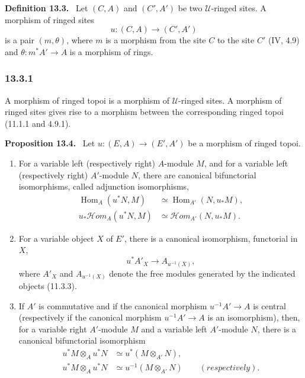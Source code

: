 \documentclass[11pt]{article}
\newcommand{\U}{\mathcal{U}}
\newcommand{\Hom}{\operatorname{Hom}}
\newcommand{\scrHom}{\mathscr{H}\!om}
\newcommand{\resp}{respectively}
\newenvironment{statement}[1]{\par\medskip\noindent\textbf{#1.}\ }{\par\medskip}
\begin{document}
\begin{statement}{Definition 13.3}
Let $(C,A)$ and $(C',A')$ be two $\U$-ringed sites. A morphism of ringed sites
\[
u:(C,A)\longrightarrow(C',A')
\]
is a pair $(m,\theta)$, where $m$ is a morphism from the site $C$ to the site $C'$ (IV, 4.9) and $\theta:m^*A'\to A$ is a morphism of rings.
\end{statement}

\subsubsection*{13.3.1}
A morphism of ringed topoi is a morphism of $\U$-ringed sites. A morphism of ringed sites gives rise to a morphism between the corresponding ringed topoi (11.1.1 and 4.9.1).

\begin{statement}{Proposition 13.4}
Let $u:(E,A)\to(E',A')$ be a morphism of ringed topoi.
\begin{enumerate}[label=\alph*)]
\item For a variable left (respectively right) $A$-module $M$, and for a variable left (respectively right) $A'$-module $N$, there are canonical bifunctorial isomorphisms, called adjunction isomorphisms,
\begin{align}
\Hom_A(u^*N,M)&\simeq \Hom_{A'}(N,u_*M),\tag{13.4.1}\\
u_*\scrHom_A(u^*N,M)&\simeq \scrHom_{A'}(N,u_*M).\tag{13.4.2}
\end{align}
\item For a variable object $X$ of $E'$, there is a canonical isomorphism, functorial in $X$,
\begin{equation}
u^*A'_X\longrightarrow A_{u^{-1}(X)},\tag{13.4.3}
\end{equation}
where $A'_X$ and $A_{u^{-1}(X)}$ denote the free modules generated by the indicated objects (11.3.3).
\item If $A'$ is commutative and if the canonical morphism $u^{-1}A'\to A$ is central (respectively if the canonical morphism $u^{-1}A'\to A$ is an isomorphism), then, for a variable right $A'$-module $M$ and a variable left $A'$-module $N$, there is a canonical bifunctorial isomorphism
\begin{align}
u^*M\otimes_Au^*N&\simeq u^*(M\otimes_{A'}N),\tag{13.4.4}\\
u^*M\otimes_Au^*N&\simeq u^{-1}(M\otimes_{A'}N)\qquad(\resp).\tag{13.4.5}
\end{align}
\end{enumerate}
\end{statement}
\end{document}
